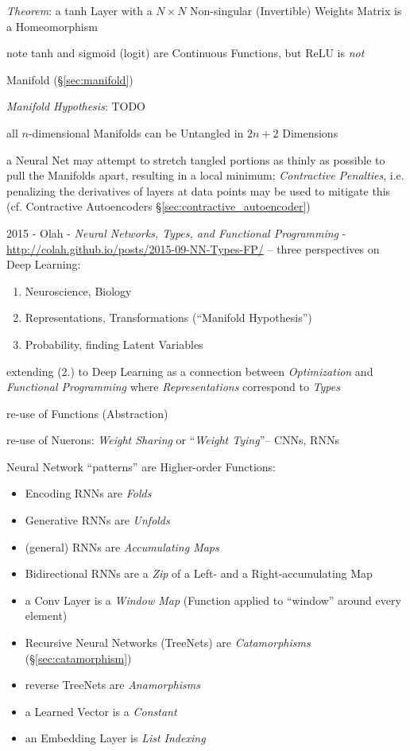 \emph{Theorem}: a tanh Layer with a $N \times N$ Non-singular (Invertible)
Weights Matrix is a Homeomorphism

note tanh and sigmoid (logit) are Continuous Functions, but ReLU is \emph{not}

Manifold (\S\ref{sec:manifold})

\emph{Manifold Hypothesis}: TODO

all $n$-dimensional Manifolds can be Untangled in $2n + 2$ Dimensions

a Neural Net may attempt to stretch tangled portions as thinly as possible to
pull the Manifolds apart, resulting in a local minimum; \emph{Contractive
  Penalties}, i.e. penalizing the derivatives of layers at data points may be
used to mitigate this (cf. Contractive Autoencoders
\S\ref{sec:contractive_autoencoder})

\asterism

2015 - Olah - \emph{Neural Networks, Types, and Functional Programming}
- \url{http://colah.github.io/posts/2015-09-NN-Types-FP/} --
three perspectives on Deep Learning:
\begin{enumerate}
  \item Neuroscience, Biology
  \item Representations, Transformations (``Manifold Hypothesis'')
  \item Probability, finding Latent Variables
\end{enumerate}
extending (2.) to Deep Learning as a connection between \emph{Optimization} and
\emph{Functional Programming} where \emph{Representations} correspond to
\emph{Types}

re-use of Functions (Abstraction)

re-use of Nuerons: \emph{Weight Sharing} or ``\emph{Weight Tying}''-- CNNs, RNNs

Neural Network ``patterns'' are Higher-order Functions:
\begin{itemize}
  \item Encoding RNNs are \emph{Folds}
  \item Generative RNNs are \emph{Unfolds}
  \item (general) RNNs are \emph{Accumulating Maps}
  \item Bidirectional RNNs are a \emph{Zip} of a Left- and a Right-accumulating
    Map
  \item a Conv Layer is a \emph{Window Map} (Function applied to ``window''
    around every element)
  \item Recursive Neural Networks (TreeNets) are \emph{Catamorphisms}
    (\S\ref{sec:catamorphism})
  \item reverse TreeNets are \emph{Anamorphisms}
  \item a Learned Vector is a \emph{Constant}
  \item an Embedding Layer is \emph{List Indexing}
\end{itemize}



